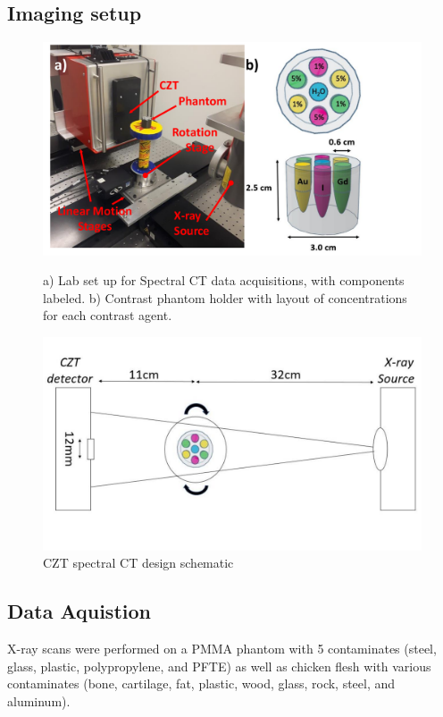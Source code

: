 \documentclass[journal, a4paper]{IEEEtran}
\begin{document}
\subsection{Imaging setup}
\begin{center}
\begin{figure}[htbp]
\includegraphics[width=\linewidth]{PhantomOrientation.pdf}
\caption{a) Lab set up for Spectral CT data acquisitions, with components labeled.  b) Contrast phantom holder with layout of concentrations for each contrast agent. }

\includegraphics[width=\linewidth]{LabSchematic.pdf}
\caption{CZT spectral CT design schematic}
\label{imagingsetup}
\end{figure}
\end{center}


\subsection{Data Aquistion}
X-ray scans were performed on a PMMA phantom with 5 contaminates (steel, glass, plastic, polypropylene, and PFTE) as well as chicken flesh with various contaminates (bone, cartilage, fat, plastic, wood, glass, rock, steel, and aluminum).
\end{document}

